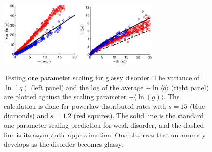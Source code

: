 \documentclass[onecolumn,fleqn,notitlepage,secnumarabic]{revtex4}
\begin{document}

\begin{figure}

\includegraphics[clip,width=4cm]{varVSavg}
\includegraphics[clip,width=4cm]{avgVSavg}

\caption{ \footnotesize 
Testing one parameter scaling for glassy disorder. 
The variance of $\ln(g)$ (left panel) and the log of the average $-\ln\langle g \rangle$ (right panel)
are plotted against the scaling parameter $-\langle \ln(g) \rangle$. 
The calculation is done for powerlaw distributed rates 
with ${s=15}$ (blue diamonds) and ${s=1.2}$ (red squares).
The solid line is the standard one parameter scaling prediction for weak disorder, 
and the dashed line is its asymptotic approximation. 
One observes that an anomaly develops as the disorder becomes glassy.}

\label{f3}
\end{figure}
\end{document}
